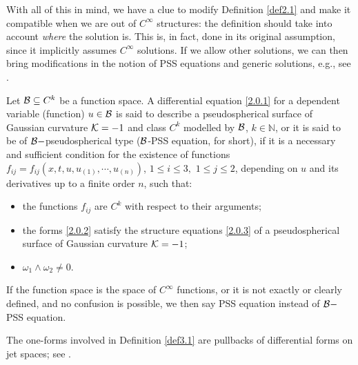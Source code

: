 \documentclass{cimart}
\begin{document}
With all of this in mind, we have a clue to modify Definition \ref{def2.1} and make it compatible when we are out of $C^\infty$ structures: the definition should take into account {\it where} the solution is. This is, in fact, done in its original assumption, since it implicitly assumes $C^\infty$ solutions. If we allow other solutions, we can then bring modifications in the notion of PSS equations and generic solutions, e.g., see \cite{freire-ch,freire-dp}.



\begin{definition}\label{def3.1}
Let ${\cal B}\subseteq C^k$ be a function space. A differential equation \eqref{2.0.1} for a dependent variable (function) $u\in{\cal B}$ is said to describe a pseudospherical surface of Gaussian curvature ${\cal K}=-1$ and class $C^k$ modelled by ${\cal B}$, $k\in\mathbb{N}$, or it is said to be of ${\cal B}-$pseudospherical type (${\cal B}$-PSS equation, for short), if it is a necessary and sufficient condition for the existence of functions $f_{ij}=f_{ij}(x,t,u,u_{(1)},\cdots,u_{(n)})$, $1\leq i\leq 3,\,\,1\leq j\leq 2$, depending on $u$ and its derivatives up to a finite order $n$, such that:
\begin{itemize}
    \item the functions $f_{ij}$ are $C^k$ with respect to their arguments;
    \item the forms \eqref{2.0.2} satisfy the structure equations \eqref{2.0.3} of a pseudospherical surface of Gaussian curvature ${\cal K}=-1$;
    \item $\omega_1\wedge\omega_2\neq0$.
\end{itemize}
\end{definition}

If the function space is the space of $C^\infty$ functions, or it is not exactly or clearly defined, and no confusion is possible, we then say PSS equation instead of ${\cal B}-$PSS equation.

\begin{remark}
The one-forms involved in Definition \ref{def3.1} are pullbacks of differential forms on jet spaces; see \cite[Section II]{reyes2000jmp}.
\end{remark}
\end{document}
